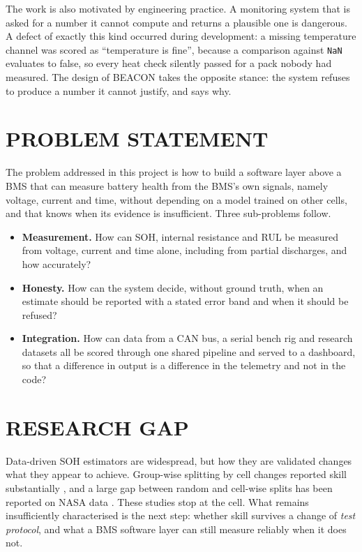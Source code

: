 \documentclass[12pt,a4paper]{amritareport}
\begin{document}
The work is also motivated by engineering practice. A monitoring system that is asked for a number it cannot compute and returns a plausible one is dangerous. A defect of exactly this kind occurred during development: a missing temperature channel was scored as ``temperature is fine'', because a comparison against \texttt{NaN} evaluates to false, so every heat check silently passed for a pack nobody had measured. The design of BEACON takes the opposite stance: the system refuses to produce a number it cannot justify, and says why.

\section{PROBLEM STATEMENT}

The problem addressed in this project is how to build a software layer above a BMS that can measure battery health from the BMS's own signals, namely voltage, current and time, without depending on a model trained on other cells, and that knows when its evidence is insufficient. Three sub-problems follow.

\begin{itemize}
    \item \textbf{Measurement.} How can SOH, internal resistance and RUL be measured from voltage, current and time alone, including from partial discharges, and how accurately?
    \item \textbf{Honesty.} How can the system decide, without ground truth, when an estimate should be reported with a stated error band and when it should be refused?
    \item \textbf{Integration.} How can data from a CAN bus, a serial bench rig and research datasets all be scored through one shared pipeline and served to a dashboard, so that a difference in output is a difference in the telemetry and not in the code?
\end{itemize}

\section{RESEARCH GAP}

Data-driven SOH estimators are widespread, but how they are validated changes what they appear to achieve. Group-wise splitting by cell changes reported skill substantially \cite{maher2025}, and a large gap between random and cell-wise splits has been reported on NASA data \cite{le2026}. These studies stop at the cell. What remains insufficiently characterised is the next step: whether skill survives a change of \emph{test protocol}, and what a BMS software layer can still measure reliably when it does not.
\end{document}
